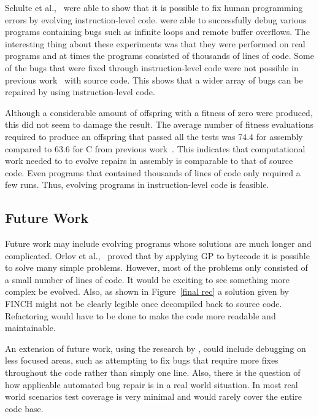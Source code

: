 \documentclass{sig-alternate}
\begin{document}
Schulte et al.,~\cite{Assembly:2010} were able to show that it is possible to fix human programming errors by evolving instruction-level code. \cite{Assembly:2010} were able to successfully debug various programs containing bugs such as infinite loops and remote buffer overflows. The interesting thing about these experiments was that they were performed on real programs and at times the programs consisted of thousands of lines of code. Some of the bugs that were fixed through instruction-level code were not possible in previous work~\cite{Forrest:2009} with source code. This shows that a wider array of bugs can be repaired by using instruction-level code.

Although a considerable amount of offspring with a fitness of zero were produced, this did not seem to damage the result. The average number of fitness evaluations required to produce an offspring that passed all the tests was 74.4 for assembly compared to 63.6 for C from previous work~\cite{Forrest:2009}. This indicates that computational work needed to to evolve repairs in assembly is comparable to that of source code. Even programs that contained thousands of lines of code only required a few runs. Thus, evolving programs in instruction-level code is feasible.
 

\subsection{Future Work}


Future work may include evolving programs whose solutions are much longer and complicated. Orlov et al.,~\cite{FINCH:2011} proved that by applying GP to bytecode it is possible to solve many simple problems. However, most of the problems only consisted of a small number of lines of code. It would be exciting to see something more complex be evolved. Also, as shown in Figure~\ref{final rec} a solution given by FINCH might not be clearly legible once decompiled back to source code. Refactoring would have to be done to make the code more readable and maintainable.

An extension of future work, using the research by \cite{Assembly:2010}, could include debugging on less focused areas, such as attempting to fix bugs that require more fixes throughout the code rather than simply one line. Also, there is the question of how applicable automated bug repair is in a real world situation. In most real world scenarios test coverage is very minimal and would rarely cover the entire code base.
\end{document}
